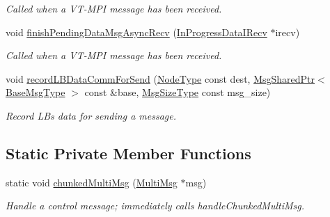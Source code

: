 \begin{DoxyCompactItemize}
\begin{DoxyCompactList}\small\item\em Called when a V\+T-\/\+M\+PI message has been received. \end{DoxyCompactList}\item 
void \hyperlink{structvt_1_1messaging_1_1_active_messenger_a80a13017308870133ff8538741bee394}{finish\+Pending\+Data\+Msg\+Async\+Recv} (\hyperlink{structvt_1_1messaging_1_1_in_progress_data_i_recv}{In\+Progress\+Data\+I\+Recv} $\ast$irecv)
\begin{DoxyCompactList}\small\item\em Called when a V\+T-\/\+M\+PI message has been received. \end{DoxyCompactList}\item 
void \hyperlink{structvt_1_1messaging_1_1_active_messenger_a142aeb4905ce18e3c01250f880bca062}{record\+L\+B\+Data\+Comm\+For\+Send} (\hyperlink{namespacevt_a866da9d0efc19c0a1ce79e9e492f47e2}{Node\+Type} const dest, \hyperlink{structvt_1_1messaging_1_1_msg_shared_ptr}{Msg\+Shared\+Ptr}$<$ \hyperlink{namespacevt_a44d0d4e144748f2b19a1cfd962f50338}{Base\+Msg\+Type} $>$ const \&base, \hyperlink{namespacevt_a408e86a8c7c89309b52907dc5a513924}{Msg\+Size\+Type} const msg\+\_\+size)
\begin{DoxyCompactList}\small\item\em Record LB\textquotesingle{}s data for sending a message. \end{DoxyCompactList}\end{DoxyCompactItemize}
\subsection*{Static Private Member Functions}
\begin{DoxyCompactItemize}
\item 
static void \hyperlink{structvt_1_1messaging_1_1_active_messenger_ae8f6417a532c73601f9c26190a29a21e}{chunked\+Multi\+Msg} (\hyperlink{structvt_1_1messaging_1_1_multi_msg}{Multi\+Msg} $\ast$msg)
\begin{DoxyCompactList}\small\item\em Handle a control message; immediately calls {\ttfamily handle\+Chunked\+Multi\+Msg}. \end{DoxyCompactList}\end{DoxyCompactItemize}

